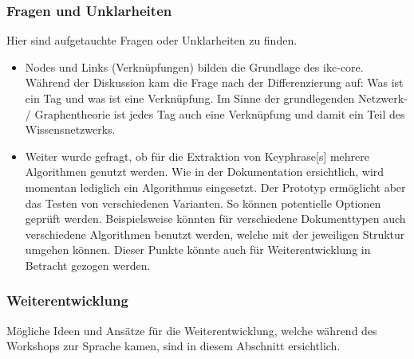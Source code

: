 \subsubsection{Fragen und Unklarheiten}
Hier sind aufgetauchte Fragen oder Unklarheiten zu finden.

\begin{itemize}
    \item Nodes und Links (Verknüpfungen) bilden die Grundlage des \gls{ikc-core}. Während der Diskussion kam die Frage nach der Differenzierung auf: Was ist ein Tag und was ist eine Verknüpfung. Im Sinne der grundlegenden Netzwerk- / Graphentheorie ist jedes Tag auch eine Verknüpfung und damit ein Teil des Wissensnetzwerks.
    \item Weiter wurde gefragt, ob für die Extraktion von \gls{Keyphrase}[s] mehrere Algorithmen genutzt werden. Wie in der Dokumentation ersichtlich, wird momentan lediglich ein Algorithmus eingesetzt. Der Prototyp ermöglicht aber das Testen von verschiedenen Varianten. So können potentielle Optionen geprüft werden. Beispielsweise könnten für verschiedene Dokumenttypen auch verschiedene Algorithmen benutzt werden, welche mit der jeweiligen Struktur umgehen können. Dieser Punkte könnte auch für Weiterentwicklung in Betracht gezogen werden.
\end{itemize}

\subsubsection{Weiterentwicklung}
Mögliche Ideen und Ansätze für die Weiterentwicklung, welche wäh\-rend des Workshops zur Sprache kamen, sind in diesem Abschnitt ersichtlich.

